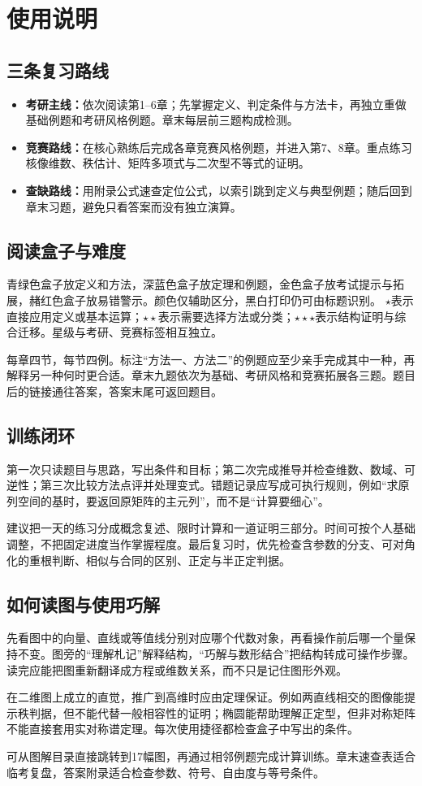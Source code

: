 \chapter*{使用说明}
\section*{三条复习路线}
\begin{itemize}
\item \textbf{考研主线：}依次阅读第1--6章；先掌握定义、判定条件与方法卡，再独立重做基础例题和考研风格例题。章末每层前三题构成检测。
\item \textbf{竞赛路线：}在核心熟练后完成各章竞赛风格例题，并进入第7、8章。重点练习核像维数、秩估计、矩阵多项式与二次型不等式的证明。
\item \textbf{查缺路线：}用附录公式速查定位公式，以索引跳到定义与典型例题；随后回到章末习题，避免只看答案而没有独立演算。
\end{itemize}
\section*{阅读盒子与难度}
青绿色盒子放定义和方法，深蓝色盒子放定理和例题，金色盒子放考试提示与拓展，赭红色盒子放易错警示。颜色仅辅助区分，黑白打印仍可由标题识别。
$\star$表示直接应用定义或基本运算；$\star\star$表示需要选择方法或分类；$\star\star\star$表示结构证明与综合迁移。星级与考研、竞赛标签相互独立。

每章四节，每节四例。标注“方法一、方法二”的例题应至少亲手完成其中一种，再解释另一种何时更合适。章末九题依次为基础、考研风格和竞赛拓展各三题。题目后的链接通往答案，答案末尾可返回题目。
\section*{训练闭环}
第一次只读题目与思路，写出条件和目标；第二次完成推导并检查维数、数域、可逆性；第三次比较方法点评并处理变式。错题记录应写成可执行规则，例如“求原列空间的基时，要返回原矩阵的主元列”，而不是“计算要细心”。

建议把一天的练习分成概念复述、限时计算和一道证明三部分。时间可按个人基础调整，不把固定进度当作掌握程度。最后复习时，优先检查含参数的分支、可对角化的重根判断、相似与合同的区别、正定与半正定判据。
\section*{如何读图与使用巧解}
先看图中的向量、直线或等值线分别对应哪个代数对象，再看操作前后哪一个量保持不变。图旁的“理解札记”解释结构，“巧解与数形结合”把结构转成可操作步骤。读完应能把图重新翻译成方程或维数关系，而不只是记住图形外观。

在二维图上成立的直觉，推广到高维时应由定理保证。例如两直线相交的图像能提示秩判据，但不能代替一般相容性的证明；椭圆能帮助理解正定型，但非对称矩阵不能直接套用实对称谱定理。每次使用捷径都检查盒子中写出的条件。

可从图解目录直接跳转到17幅图，再通过相邻例题完成计算训练。章末速查表适合临考复盘，答案附录适合检查参数、符号、自由度与等号条件。
